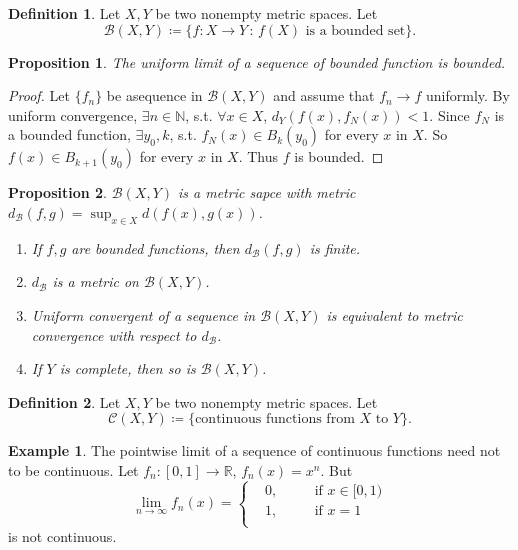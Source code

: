 \documentclass[12pt]{article}
\theoremstyle{plain}
\newtheorem*{prop}{Proposition}
\theoremstyle{definition}
\newtheorem*{defn}{Definition}
\newtheorem*{eg}{Example}
\begin{document}
\begin{defn}
    Let $X,Y$ be two nonempty metric spaces. Let 
    $$\mathcal{B}(X,Y)\coloneqq\{f:X\rightarrow Y\,:\,f(X)\text{ is a bounded
    set}\}.$$
\end{defn}

\begin{prop}
    The uniform limit of a sequence of bounded function is bounded.
\end{prop}
\begin{proof}
    Let $\{f_n\}$ be asequence in $\mathcal{B}(X,Y)$ and assume that
    $f_n\rightarrow f$ uniformly.
    By uniform convergence, $\exists n\in\mathbb{N}$, s.t. $\forall x\in X$,
    $d_Y(f(x),f_N(x))<1$.
    Since $f_N$ is a bounded function, $\exists y_0, k$, s.t. $f_N(x)\in
    B_k(y_0)$ for every $x$ in $X$.
    So $f(x)\in B_{k+1}(y_0)$ for every $x$ in $X$.
    Thus $f$ is bounded.
\end{proof}


\begin{prop}
    $\mathcal{B}(X,Y)$ is a metric sapce with metric
    $d_\mathcal{B}(f,g)=\sup_{x\in X}d(f(x),g(x))$.
    \begin{enumerate}
        \item If $f, g$ are bounded functions, then $d_{\mathcal{B}}(f,g)$ is
        finite.
        \item $d_\mathcal{B}$ is a metric on $\mathcal{B}(X,Y)$.
        \item Uniform convergent of a sequence in $\mathcal{B}(X,Y)$ is
        equivalent to metric convergence with respect to $d_\mathcal{B}$.
        \item If $Y$ is complete, then so is $\mathcal{B}(X,Y)$.
    \end{enumerate}
\end{prop}

\begin{defn}
    Let $X,Y$ be two nonempty metric spaces. Let
    $$\mathcal{C}(X,Y)\coloneqq\{\text{continuous functions from }X\text{ to }Y\}.$$
\end{defn}
\begin{eg}
    The pointwise limit of a sequence of continuous functions need not to be
    continuous.
    Let $f_n:[0,1]\rightarrow\mathbb{R}$, $f_n(x)=x^n$.
    But
    $$\lim_{n\rightarrow\infty}f_n(x)=\left\{
        \begin{aligned}
        &0,\quad&&\text{if }x\in[0,1)\\
        &1,\quad&&\text{if }x=1\\
        \end{aligned}
    \right.$$
    is not continuous.
\end{eg}
\end{document}
